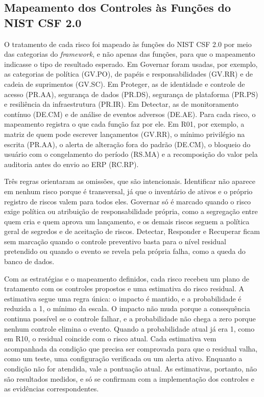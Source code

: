 \documentclass[conference]{IEEEtran}
\begin{document}
\subsection{Mapeamento dos Controles às Funções do NIST CSF 2.0}
\label{subsec:met-csf}

O tratamento de cada risco foi mapeado às funções do NIST CSF 2.0 por meio das categorias do \textit{framework}, e não apenas das funções, para que o mapeamento indicasse o tipo de resultado esperado. Em Governar foram usadas, por exemplo, as categorias de política (GV.PO), de papéis e responsabilidades (GV.RR) e de cadeia de suprimentos (GV.SC). Em Proteger, as de identidade e controle de acesso (PR.AA), segurança de dados (PR.DS), segurança de plataforma (PR.PS) e resiliência da infraestrutura (PR.IR). Em Detectar, as de monitoramento contínuo (DE.CM) e de análise de eventos adversos (DE.AE). Para cada risco, o mapeamento registra o que cada função faz por ele. Em R01, por exemplo, a matriz de quem pode escrever lançamentos (GV.RR), o mínimo privilégio na escrita (PR.AA), o alerta de alteração fora do padrão (DE.CM), o bloqueio do usuário com o congelamento do período (RS.MA) e a recomposição do valor pela auditoria antes do envio ao ERP (RC.RP).

Três regras orientaram as omissões, que são intencionais. Identificar não aparece em nenhum risco porque é transversal, já que o inventário de ativos e o próprio registro de riscos valem para todos eles. Governar só é marcado quando o risco exige política ou atribuição de responsabilidade própria, como a segregação entre quem cria e quem aprova um lançamento, e os demais riscos seguem a política geral de segredos e de aceitação de riscos. Detectar, Responder e Recuperar ficam sem marcação quando o controle preventivo basta para o nível residual pretendido ou quando o evento se revela pela própria falha, como a queda do banco de dados.

Com as estratégias e o mapeamento definidos, cada risco recebeu um plano de tratamento com os controles propostos e uma estimativa do risco residual. A estimativa segue uma regra única: o impacto é mantido, e a probabilidade é reduzida a 1, o mínimo da escala. O impacto não muda porque a consequência continua possível se o controle falhar, e a probabilidade não chega a zero porque nenhum controle elimina o evento. Quando a probabilidade atual já era 1, como em R10, o residual coincide com o risco atual. Cada estimativa vem acompanhada da condição que precisa ser comprovada para que o residual valha, como um teste, uma configuração verificada ou um alerta ativo. Enquanto a condição não for atendida, vale a pontuação atual. As estimativas, portanto, não são resultados medidos, e só se confirmam com a implementação dos controles e as evidências correspondentes.
\end{document}
